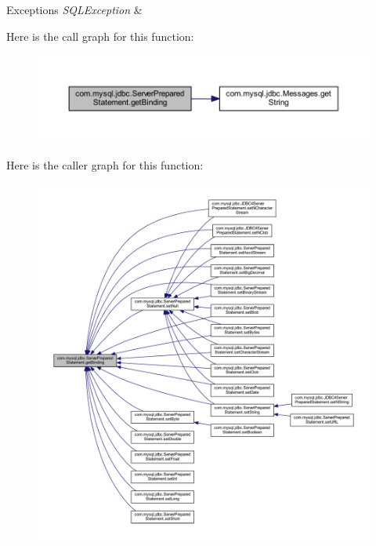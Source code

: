 \begin{DoxyExceptions}{Exceptions}
{\em S\+Q\+L\+Exception} & \\
\hline
\end{DoxyExceptions}
Here is the call graph for this function\+:
\nopagebreak
\begin{figure}[H]
\begin{center}
\leavevmode
\includegraphics[width=350pt]{classcom_1_1mysql_1_1jdbc_1_1_server_prepared_statement_abe61386d18ae6ff80a37435054d1ab98_cgraph}
\end{center}
\end{figure}
Here is the caller graph for this function\+:
\nopagebreak
\begin{figure}[H]
\begin{center}
\leavevmode
\includegraphics[width=350pt]{classcom_1_1mysql_1_1jdbc_1_1_server_prepared_statement_abe61386d18ae6ff80a37435054d1ab98_icgraph}
\end{center}
\end{figure}
\mbox{\label{classcom_1_1mysql_1_1jdbc_1_1_server_prepared_statement_af8dc86dfa81a0998b2462a95b0f754a6}} 
